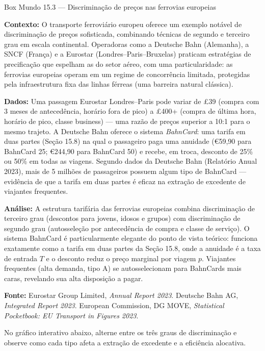 \documentclass[11pt,twoside,openright]{book}
\begin{document}
\begin{boxmundobox}{Box Mundo 15.3 — Discriminação de preços nas ferrovias europeias}

\textbf{Contexto:} O transporte ferroviário europeu oferece um exemplo
notável de discriminação de preços sofisticada, combinando técnicas de
segundo e terceiro grau em escala continental. Operadoras como a
Deutsche Bahn (Alemanha), a SNCF (França) e a Eurostar
(Londres--Paris--Bruxelas) praticam estratégias de precificação que
espelham as do setor aéreo, com uma particularidade: as ferrovias
europeias operam em um regime de concorrência limitada, protegidas pela
infraestrutura fixa das linhas férreas (uma barreira natural clássica).

\textbf{Dados:} Uma passagem Eurostar Londres--Paris pode variar de £39
(compra com 3 meses de antecedência, horário fora de pico) a £400+
(compra de última hora, horário de pico, classe business) --- uma razão
de preços superior a 10:1 para o mesmo trajeto. A Deutsche Bahn oferece
o sistema \emph{BahnCard}: uma tarifa em duas partes (Seção 15.8) na
qual o passageiro paga uma anuidade (€59,90 para BahnCard 25; €244,90
para BahnCard 50) e recebe, em troca, desconto de 25\% ou 50\% em todas
as viagens. Segundo dados da Deutsche Bahn (Relatório Anual 2023), mais
de 5 milhões de passageiros possuem algum tipo de BahnCard --- evidência
de que a tarifa em duas partes é eficaz na extração de excedente de
viajantes frequentes.

\textbf{Análise:} A estrutura tarifária das ferrovias europeias combina
discriminação de terceiro grau (descontos para jovens, idosos e grupos)
com discriminação de segundo grau (autosseleção por antecedência de
compra e classe de serviço). O sistema BahnCard é particularmente
elegante do ponto de vista teórico: funciona exatamente como a tarifa em
duas partes da Seção 15.8, onde a anuidade é a taxa de entrada \(T\) e o
desconto reduz o preço marginal por viagem \(p\). Viajantes frequentes
(alta demanda, tipo A) se autosselecionam para BahnCards mais caras,
revelando sua alta disposição a pagar.

\textbf{Fonte:} Eurostar Group Limited, \emph{Annual Report 2023}.
Deutsche Bahn AG, \emph{Integrated Report 2023}. European Commission, DG
MOVE, \emph{Statistical Pocketbook: EU Transport in Figures 2023}.

\end{boxmundobox}

No gráfico interativo abaixo, alterne entre os três graus de
discriminação e observe como cada tipo afeta a extração de excedente e a
eficiência alocativa.
\end{document}
